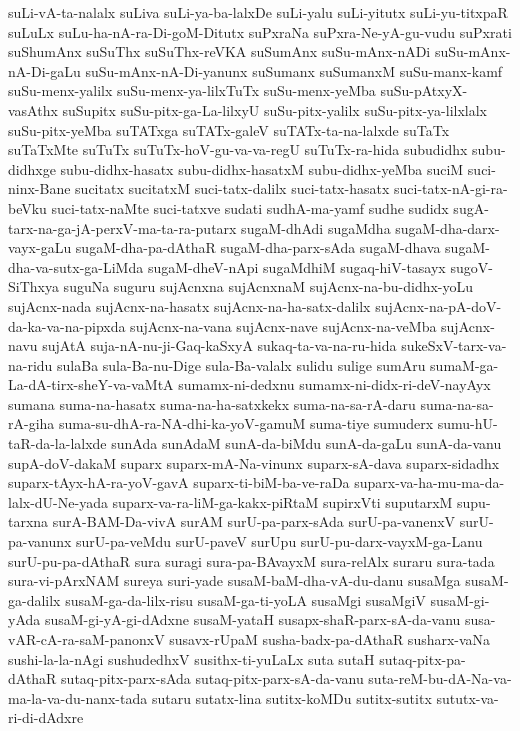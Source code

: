 {suLi-vA-ta-nalalx
suLiva
suLi-ya-ba-lalxDe
suLi-yalu
suLi-yitutx
suLi-yu-titxpaR
suLuLx
suLu-ha-nA-ra-Di-goM-Ditutx
suPxraNa
suPxra-Ne-yA-gu-vudu
suPxrati
suShumAnx
suSuThx
suSuThx-reVKA
suSumAnx
suSu-mAnx-nADi
suSu-mAnx-nA-Di-gaLu
suSu-mAnx-nA-Di-yanunx
suSumanx
suSumanxM
suSu-manx-kamf
suSu-menx-yalilx
suSu-menx-ya-lilxTuTx
suSu-menx-yeMba
suSu-pAtxyX-vasAthx
suSupitx
suSu-pitx-ga-La-lilxyU
suSu-pitx-yalilx
suSu-pitx-ya-lilxlalx
suSu-pitx-yeMba
suTATxga
suTATx-galeV
suTATx-ta-na-lalxde
suTaTx
suTaTxMte
suTuTx
suTuTx-hoV-gu-va-va-regU
suTuTx-ra-hida
subudidhx
subu-didhxge
subu-didhx-hasatx
subu-didhx-hasatxM
subu-didhx-yeMba
suciM
suci-ninx-Bane
sucitatx
sucitatxM
suci-tatx-dalilx
suci-tatx-hasatx
suci-tatx-nA-gi-ra-beVku
suci-tatx-naMte
suci-tatxve
sudati
sudhA-ma-yamf
sudhe
sudidx
sugA-tarx-na-ga-jA-perxV-ma-ta-ra-putarx
sugaM-dhAdi
sugaMdha
sugaM-dha-darx-vayx-gaLu
sugaM-dha-pa-dAthaR
sugaM-dha-parx-sAda
sugaM-dhava
sugaM-dha-va-sutx-ga-LiMda
sugaM-dheV-nApi
sugaMdhiM
sugaq-hiV-tasayx
sugoV-SiThxya
suguNa
suguru
sujAcnxna
sujAcnxnaM
sujAcnx-na-bu-didhx-yoLu
sujAcnx-nada
sujAcnx-na-hasatx
sujAcnx-na-ha-satx-dalilx
sujAcnx-na-pA-doV-da-ka-va-na-pipxda
sujAcnx-na-vana
sujAcnx-nave
sujAcnx-na-veMba
sujAcnx-navu
sujAtA
suja-nA-nu-ji-Gaq-kaSxyA
sukaq-ta-va-na-ru-hida
sukeSxV-tarx-va-na-ridu
sulaBa
sula-Ba-nu-Dige
sula-Ba-valalx
sulidu
sulige
sumAru
sumaM-ga-La-dA-tirx-sheY-va-vaMtA
sumamx-ni-dedxnu
sumamx-ni-didx-ri-deV-nayAyx
sumana
suma-na-hasatx
suma-na-ha-satxkekx
suma-na-sa-rA-daru
suma-na-sa-rA-giha
suma-su-dhA-ra-NA-dhi-ka-yoV-gamuM
suma-tiye
sumuderx
sumu-hU-taR-da-la-lalxde
sunAda
sunAdaM
sunA-da-biMdu
sunA-da-gaLu
sunA-da-vanu
supA-doV-dakaM
suparx
suparx-mA-Na-vinunx
suparx-sA-dava
suparx-sidadhx
suparx-tAyx-hA-ra-yoV-gavA
suparx-ti-biM-ba-ve-raDa
suparx-va-ha-mu-ma-da-lalx-dU-Ne-yada
suparx-va-ra-liM-ga-kakx-piRtaM
supirxVti
suputarxM
supu-tarxna
surA-BAM-Da-vivA
surAM
surU-pa-parx-sAda
surU-pa-vanenxV
surU-pa-vanunx
surU-pa-veMdu
surU-paveV
surUpu
surU-pu-darx-vayxM-ga-Lanu
surU-pu-pa-dAthaR
sura
suragi
sura-pa-BAvayxM
sura-relAlx
suraru
sura-tada
sura-vi-pArxNAM
sureya
suri-yade
susaM-baM-dha-vA-du-danu
susaMga
susaM-ga-dalilx
susaM-ga-da-lilx-risu
susaM-ga-ti-yoLA
susaMgi
susaMgiV
susaM-gi-yAda
susaM-gi-yA-gi-dAdxne
susaM-yataH
susapx-shaR-parx-sA-da-vanu
susa-vAR-cA-ra-saM-panonxV
susavx-rUpaM
susha-badx-pa-dAthaR
susharx-vaNa
sushi-la-la-nAgi
sushudedhxV
susithx-ti-yuLaLx
suta
sutaH
sutaq-pitx-pa-dAthaR
sutaq-pitx-parx-sAda
sutaq-pitx-parx-sA-da-vanu
suta-reM-bu-dA-Na-va-ma-la-va-du-nanx-tada
sutaru
sutatx-lina
sutitx-koMDu
sutitx-sutitx
sututx-va-ri-di-dAdxre
}
